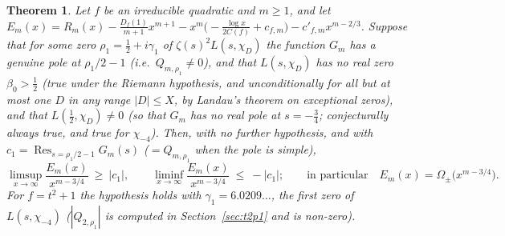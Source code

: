 \documentclass[11pt,a4paper]{article}
\newtheorem{theorem}{Theorem}
\theoremstyle{remark}\newtheorem{remark}[theorem]{Remark}
\begin{document}
\begin{theorem}\label{thm:omega}
Let $f$ be an irreducible quadratic and $m\ge1$, and let
$E_m(x)=R_m(x)-\frac{D_f(1)}{m+1}x^{m+1}-x^m\bigl(-\frac{\log x}{2C(f)}+c_{f,m}\bigr)-c'_{f,m}x^{m-2/3}$.
Suppose that for some zero $\rho_1=\tfrac12+i\gamma_1$ of $\zeta(s)^2L(s,\chi_D)$ the function $G_m$ has a genuine
pole at $\rho_1/2-1$ (i.e.\ $Q_{m,\rho_1}\ne0$), and that $L(s,\chi_D)$ has no real zero $\beta_0>\tfrac12$ (true under the
Riemann hypothesis, and unconditionally for all but at most one $D$ in any range $|D|\le X$, by Landau's theorem on
exceptional zeros), and that $L(\tfrac12,\chi_D)\ne0$ (so that $G_m$ has no real pole at $s=-\tfrac34$; conjecturally always
true, and true for $\chi_{-4}$). Then, with no further hypothesis, and with $c_1=\operatorname*{Res}_{s=\rho_1/2-1}G_m(s)$
($=Q_{m,\rho_1}$ when the pole is simple),
\[
\limsup_{x\to\infty}\frac{E_m(x)}{x^{m-3/4}}\ \ge\ |c_1|,\qquad \liminf_{x\to\infty}\frac{E_m(x)}{x^{m-3/4}}\ \le\ -|c_1|;
\qquad\text{in particular}\quad E_m(x)=\Omega_\pm\bigl(x^{m-3/4}\bigr).
\]
For $f=t^2+1$ the hypothesis holds with $\gamma_1=6.0209\dots$, the first zero of $L(s,\chi_{-4})$
($|Q_{2,\rho_1}|$ is computed in Section~\ref{sec:t2p1} and is non-zero).
\end{theorem}
\end{document}
